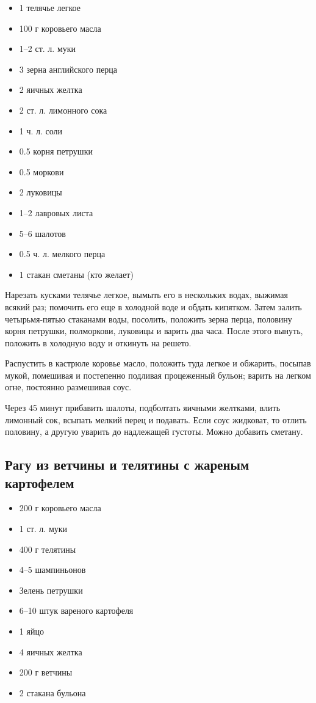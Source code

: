 \begin{itemize}
	\item 1 телячье легкое 
    \item 100 г коровьего масла 
    \item 1–2 ст. л. муки 
    \item 3 зерна английского перца
    \item 2 яичных желтка 
    \item 2 ст. л. лимонного сока
    \item 1 ч. л. соли
    \item 0.5 корня петрушки
    \item 0.5 моркови
    \item 2 луковицы
    \item 1–2 лавровых листа
    \item 5–6 шалотов
    \item 0.5 ч. л. мелкого перца
    \item 1 стакан сметаны (кто желает)
\end{itemize}

Нарезать кусками телячье легкое, вымыть его в нескольких водах, выжимая всякий раз; помочить его еще в холодной воде и обдать кипятком. Затем залить четырьмя-пятью стаканами воды, посолить, положить зерна перца, половину корня петрушки, полморкови, луковицы и варить два часа. После этого вынуть, положить в холодную воду и откинуть на решето.

Распустить в кастрюле коровье масло, положить туда легкое и обжарить, посыпав мукой, помешивая и постепенно подливая процеженный бульон; варить на легком огне, постоянно размешивая соус.

Через 45 минут прибавить шалоты, подболтать яичными желтками, влить лимонный сок, всыпать мелкий перец и подавать. Если соус жидковат, то отлить половину, а другую уварить до надлежащей густоты. Можно добавить сметану.

\subsection{Рагу из ветчины и телятины с жареным картофелем}

\begin{itemize}
	\item 200 г коровьего масла 
    \item 1 ст. л. муки
    \item 400 г телятины 
    \item 4–5 шампиньонов 
    \item Зелень петрушки 
    \item 6–10 штук вареного картофеля 
    \item 1 яйцо 
    \item 4 яичных желтка 
    \item 200 г ветчины 
    \item 2 стакана бульона
\end{itemize}

